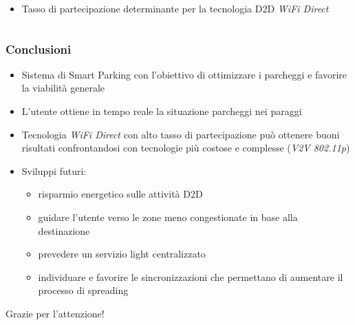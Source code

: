 \documentclass{beamer}
\begin{document}
\begin{frame}[shrink=40]
\begin{columns}
\begin{column}{0.45\textwidth}
\begin{figure}
      \end{figure}
      \begin{itemize}
	\item  Tasso di partecipazione determinante per la tecnologia D2D \textit{WiFi Direct}
      \end{itemize}
    \end{column}
  \end{columns}
\end{frame}


\begin{frame}
\frametitle{Conclusioni}
  \begin{itemize}
    \item Sistema di Smart Parking con l'obiettivo di ottimizzare i parcheggi e favorire la viabilità generale
    \item L'utente ottiene in tempo reale la situazione parcheggi nei paraggi
    \item Tecnologia \textit{WiFi Direct} con alto tasso di partecipazione può ottenere buoni risultati confrontandosi con tecnologie più costose e complesse (\textit{V2V 802.11p})
    \item Sviluppi futuri: 
      \begin{itemize}
	\item risparmio energetico sulle attività D2D
	\item guidare l'utente verso le zone meno congestionate in base alla destinazione
	\item prevedere un servizio light centralizzato
	\item individuare e favorire le sincronizzazioni che permettano di aumentare il processo di spreading
      \end{itemize}
  \end{itemize}
\end{frame}


\begin{frame}
\Huge{\centerline{Grazie per l'attenzione!}}
\end{frame}


\end{document}
